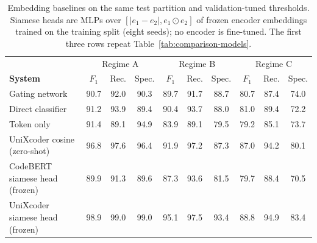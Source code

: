 \begin{table}[t]
\centering
\caption{Embedding baselines on the same test partition and validation-tuned thresholds. Siamese heads are MLPs over $[|e_1-e_2|, e_1\odot e_2]$ of frozen encoder embeddings trained on the training split (eight seeds); no encoder is fine-tuned. The first three rows repeat Table~\ref{tab:comparison-models}.}
\label{tab:embedding-baselines}
\footnotesize
\setlength{\tabcolsep}{3pt}
\begin{tabular}{l|ccc|ccc|ccc}
\toprule
 & \multicolumn{3}{c|}{Regime A} & \multicolumn{3}{c|}{Regime B} & \multicolumn{3}{c}{Regime C} \\
\textbf{System} & $F_1$ & Rec. & Spec. & $F_1$ & Rec. & Spec. & $F_1$ & Rec. & Spec. \\
\midrule
Gating network & 90.7 & 92.0 & 90.3 & 89.7 & 91.7 & 88.7 & 80.7 & 87.4 & 74.0 \\
Direct classifier & 91.2 & 93.9 & 89.4 & 90.4 & 93.7 & 88.0 & 81.0 & 89.4 & 72.2 \\
Token only & 91.4 & 89.1 & 94.9 & 83.9 & 89.1 & 79.5 & 79.2 & 85.1 & 73.7 \\
UniXcoder cosine (zero-shot) & 96.8 & 97.6 & 96.4 & 91.9 & 97.2 & 87.3 & 87.0 & 94.2 & 80.1 \\
CodeBERT siamese head (frozen) & 89.9 & 91.3 & 89.6 & 87.3 & 93.6 & 81.5 & 79.7 & 88.4 & 70.5 \\
UniXcoder siamese head (frozen) & 98.9 & 99.0 & 99.0 & 95.1 & 97.5 & 93.4 & 88.8 & 94.9 & 83.4 \\
\bottomrule
\end{tabular}
\end{table}